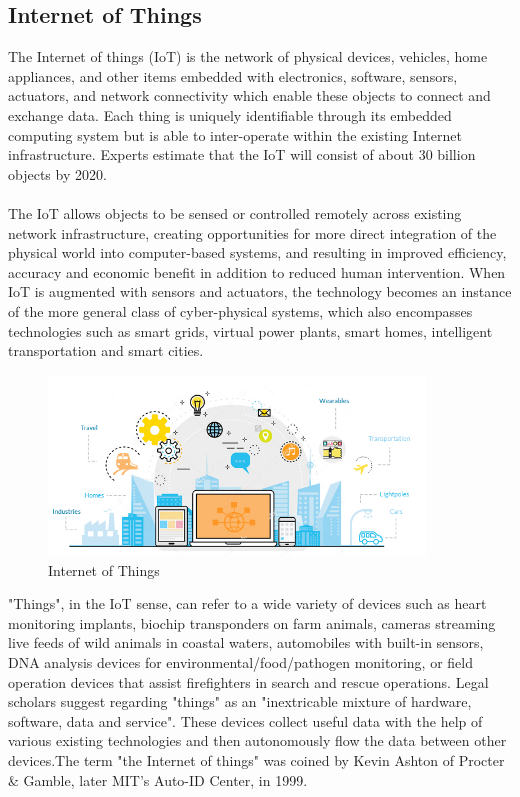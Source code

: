 \documentclass[twoside,a4paper,16pt]{book}
\begin{document}
{\subsection{Internet of Things}
The Internet of things (IoT) is the network of physical devices, vehicles, home appliances, and other items embedded with electronics, software, sensors, actuators, and network connectivity which enable these objects to connect and exchange data. Each thing is uniquely identifiable through its embedded computing system but is able to inter-operate within the existing Internet infrastructure. Experts estimate that the IoT will consist of about 30 billion objects by 2020.\\\\
The IoT allows objects to be sensed or controlled remotely across existing network infrastructure, creating opportunities for more direct integration of the physical world into computer-based systems, and resulting in improved efficiency, accuracy and economic benefit in addition to reduced human intervention. When IoT is augmented with sensors and actuators, the technology becomes an instance of the more general class of cyber-physical systems, which also encompasses technologies such as smart grids, virtual power plants, smart homes, intelligent transportation and smart cities.
 \begin{figure}[ht!]
 	\begin{center}
 		\includegraphics[width=10.0cm]{5.jpg}
 		\caption{Internet of Things}
 	\end{center}
 \end{figure}
"Things", in the IoT sense, can refer to a wide variety of devices such as heart monitoring implants, biochip transponders on farm animals, cameras streaming live feeds of wild animals in coastal waters, automobiles with built-in sensors, DNA analysis devices for environmental/food/pathogen monitoring, or field operation devices that assist firefighters in search and rescue operations. Legal scholars suggest regarding "things" as an "inextricable mixture of hardware, software, data and service".
These devices collect useful data with the help of various existing technologies and then autonomously flow the data between other devices.The term "the Internet of things" was coined by Kevin Ashton of Procter \& Gamble, later MIT's Auto-ID Center, in 1999.
}
\end{document}
